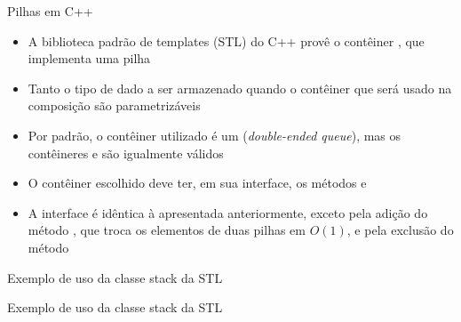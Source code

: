\begin{frame}[fragile]{Pilhas em C++}

    \begin{itemize}
        \item A biblioteca padrão de templates (STL) do C++ provê o contêiner ,
            que implementa uma pilha

        \item Tanto o tipo de dado a ser armazenado quando o contêiner que será usado na composição
            são parametrizáveis

        \item Por padrão, o contêiner utilizado é um  (\textit{double-ended queue}),
            mas os contêineres  e  são igualmente válidos

        \item O contêiner escolhido deve ter, em sua interface, os métodos 
            e 

        \item A interface é idêntica à apresentada anteriormente, exceto pela adição do método
            , que troca os elementos de duas pilhas em $O(1)$, e pela exclusão
            do método 

    \end{itemize}

\end{frame}

\begin{frame}[fragile]{Exemplo de uso da classe stack da STL}
\end{frame}

\begin{frame}[fragile]{Exemplo de uso da classe stack da STL}
\end{frame}
